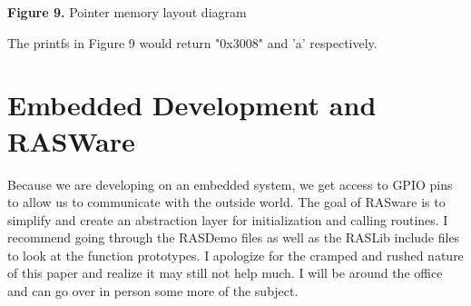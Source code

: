 \documentclass[paper=a4, fontsize=11pt]{scrartcl}
\numberwithin{equation}{section}		%
\numberwithin{figure}{section}			%
\numberwithin{table}{section}			%
\begin{document}
\vskip 0.05in
\centerline{\textbf{Figure 9. }Pointer memory layout diagram}
\vskip 0.1in

The printfs in Figure 9 would return "0x3008" and 'a' respectively.
\section{Embedded Development and RASWare} 
Because we are developing on an embedded system, we get access to GPIO pins to allow us to communicate with the outside world. The goal of RASware is to simplify and create an abstraction layer for initialization and calling routines. I recommend going through the RASDemo files as well as the RASLib include files to look at the function prototypes. I apologize for the cramped and rushed nature of this paper and realize it may still not help much. I will be around the office and can go over in person some more of the subject.

\end{document}
